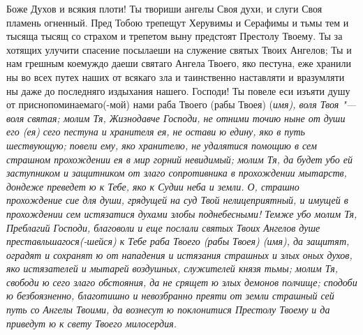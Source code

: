 Боже Духов и всякия плоти! Ты твориши ангелы Своя духи, и слуги Своя пламень огненный. Пред Тобою трепещут Херувимы и Серафимы и тьмы тем и тысяща тысящ со страхом и трепетом выну предстоят Престолу Твоему. Ты за хотящих улучити спасение посылаеши на служение святых Твоих Ангелов; Ты и нам грешным коемуждо даеши святаго Ангела Твоего, яко пестуна, еже хранили ны во всех путех наших от всякаго зла и таинственно наставляти и вразумляти ны даже до последняго издыхания нашего. Господи! Ты повеле еси изъяти душу от приснопоминаемаго(-мой) нами раба Твоего (рабы Твоея) (\itshape имя\normalfont{}), воля Твоя "--- воля святая; молим Тя, Жизнодавче Господи, не отними точию ныне от души его (ея) сего пестуна и хранителя ея, не остави ю едину, яко в путь шествующую; повели ему, яко хранителю, не удалятися помощию в сем страшном прохождении ея в мир горний невидимый; молим Тя, да будет убо ей заступником и защитником от злаго сопротивника в прохождении мытарств, дондеже преведет ю к Тебе, яко к Судии неба и земли. О, страшно прохождение сие для души, грядущей на суд Твой нелицеприятный, и имущей в прохождении сем истязатися духами злобы поднебесными! Темже убо молим Тя, Преблагий Господи, благоволи и еще послали святых Твоих Ангелов душе преставльшагося(-шейся) к Тебе раба Твоего (рабы Твоея) (\itshape имя\normalfont{}), да защитят, оградят и сохранят ю от нападения и истязания страшных и злых оных духов, яко истязателей и мытарей воздушных, служителей князя тьмы; молим Тя, свободи ю сего злаго обстояния, да не срящет ю злых демонов полчище; сподоби ю безбоязненно, благотишно и невозбранно преяти от земли страшный сей путь со Ангелы Твоими, да вознесут ю поклонитися  Престолу Твоему и да приведут ю к свету Твоего милосердия.


\mychapterending

 



